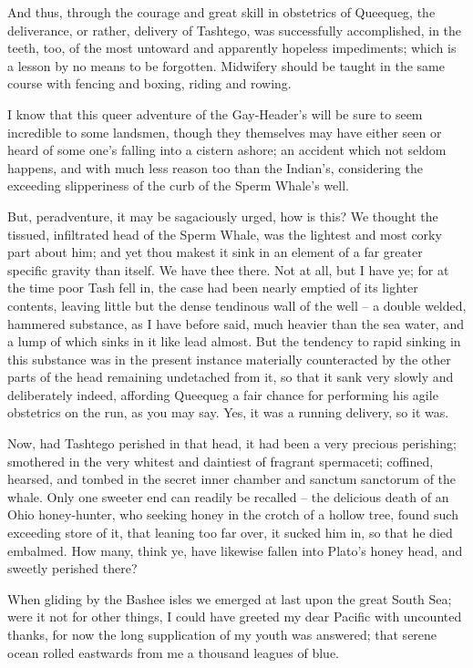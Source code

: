 \documentclass{article}
\begin{document}
   And thus, through the courage and great skill in obstetrics of Queequeg, the deliverance, or rather, delivery of Tashtego, was successfully accomplished, in the teeth, too, of the most untoward and apparently hopeless impediments; which is a lesson by no means to be forgotten. Midwifery should be taught in the same course with fencing and boxing, riding and rowing.

   I know that this queer adventure of the Gay-Header's will be sure to seem incredible to some landsmen, though they themselves may have either seen or heard of some one's falling into a cistern ashore; an accident which not seldom happens, and with much less reason too than the Indian's, considering the exceeding slipperiness of the curb of the Sperm Whale's well.

   But, peradventure, it may be sagaciously urged, how is this? We thought the tissued, infiltrated head of the Sperm Whale, was the lightest and most corky part about him; and yet thou makest it sink in an element of a far greater specific gravity than itself. We have thee there. Not at all, but I have ye; for at the time poor Tash fell in, the case had been nearly emptied of its lighter contents, leaving little but the dense tendinous wall of the well -- a double welded, hammered substance, as I have before said, much heavier than the sea water, and a lump of which sinks in it like lead almost. But the tendency to rapid sinking in this substance was in the present instance materially counteracted by the other parts of the head remaining undetached from it, so that it sank very slowly and deliberately indeed, affording Queequeg a fair chance for performing his agile 
   obstetrics on the run, as you may say. Yes, it was a running delivery, so it was.

      Now, had Tashtego perished in that head, it had been a very precious perishing; smothered in the very whitest and daintiest of fragrant spermaceti; coffined, hearsed, and tombed in the secret inner chamber and sanctum sanctorum of the whale. Only one sweeter end can readily be recalled -- the delicious death of an Ohio honey-hunter, who seeking honey in the crotch of a hollow tree, found such exceeding store of it, that leaning too far over, it sucked him in, so that he died embalmed. How many, think ye, have likewise fallen into Plato's honey head, and sweetly perished there? 


 When gliding by the Bashee isles we emerged at last upon the great South Sea; were it not for other things, I could have greeted my dear Pacific with uncounted thanks, for now the long supplication of my youth was answered; that serene ocean rolled eastwards from me a thousand leagues of blue.
\end{document}
